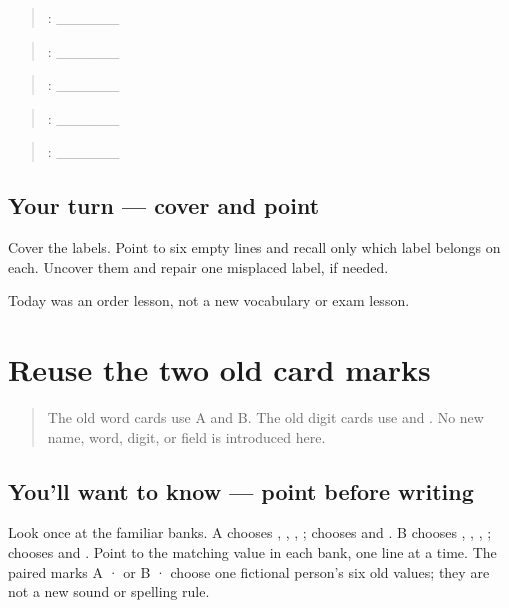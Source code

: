\begin{quote}
: \_\_\_\_\_\_
\end{quote}

\begin{quote}
: \_\_\_\_\_\_
\end{quote}

\begin{quote}
: \_\_\_\_\_\_
\end{quote}

\begin{quote}
: \_\_\_\_\_\_
\end{quote}

\begin{quote}
: \_\_\_\_\_\_
\end{quote}

\subsection*{Your turn — cover and point}
Cover the labels. Point to six empty lines and recall only which label belongs on each. Uncover them and repair one misplaced label, if needed.

\begin{tcolorbox}[breakable,colback=teal!4,colframe=teal!35!black,title={Before you move on}]
Today was an order lesson, not a new vocabulary or exam lesson.
\end{tcolorbox}
\section[\texorpdfstring{A · B · \pa{ਕ} · \pa{ਖ} (old fictional card marks)}{A · B · ਕ · ਖ (old fictional card marks)}]{Reuse the two old card marks}

\label{lesson:PA-W11-form-six-select}



\begin{quote}
The old word cards use A and B. The old digit cards use  and . No new name, word, digit, or field is introduced here.
\end{quote}

\subsection*{You'll want to know — point before writing}
Look once at the familiar banks. A chooses , , , ;  chooses  and  . B chooses , , , ;  chooses  and  . Point to the matching value in each bank, one line at a time. The paired marks A ·  or B ·  choose one fictional person's six old values; they are not a new sound or spelling rule.


